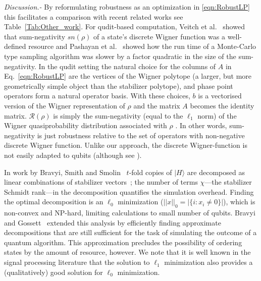 \documentclass[aps,prl,twocolumn,showpacs,superscriptaddress,groupedaddress,amsmath,amssymb]{revtex4-1}  %
\def\ket #1{\vert #1\rangle}
\begin{document}
\noindent\textit{Discussion.-} By reformulating robustness as an optimization in \eqref{eqn:RobustLP} this facilitates a comparison with recent related works see Table~\ref{Tab:Other_work}. For qudit-based computation, Veitch et al.~\cite{veitch_resource_2014} showed that sum-negativity $sn(\rho)$ of a state's discrete Wigner function was a well-defined resource and Pashayan et al.~\cite{pashayan_estimating_2015} showed how the run time of a Monte-Carlo type sampling algorithm was slower by a factor quadratic in the size of the sum-negativity. In the qudit setting the natural choice for the columns of $A$ in Eq.~\eqref{eqn:RobustLP} are the vertices of the Wigner polytope (a larger, but more geometrically simple object than the stabilizer polytope), and phase point operators form a natural operator basis. With these choices, $b$ is a vectorised version of the Wigner representation of $\rho$ and the matrix $A$ becomes the identity matrix. $\mathcal{R}(\rho)$ is simply the sum-negativity (equal to the $\ell_1$ norm) of the Wigner quasiprobability distribution associated with $\rho$ . In other words, sum-negativity is just robustness relative to the set of operators with non-negative discrete Wigner function.  Unlike our approach, the discrete Wigner-function is not easily adapted to qubits (although see \cite{delfosse_wigner_2015,raussendorf_contextuality_2015}).

In work by Bravyi, Smith and Smolin~\cite{bravyi_trading_2016} $t$-fold copies of $\ket{H}$ are decomposed as linear combinations of stabilizer vectors~\cite{garcia_geometry_2014}; the number of terms $\chi$---the stabilizer Schmidt rank---in the decomposition quantifies the simulation overhead. Finding the optimal decomposition is an $\ell_0$ minimization ($||x||_0=|\{i: x_i \neq 0\}|$), which is non-convex and NP-hard, limiting calculations to small number of qubits. Bravyi and Gossett~\cite{bravyi_improved_2016} extended this analysis by efficiently finding approximate decompositions that are still sufficient for the task of simulating the outcome of a quantum algorithm. This approximation precludes the possibility of ordering states by the amount of resource, however.  We note that it is well known in the signal processing literature \cite{candes_decoding_2005} that the solution to $\ell_1$ minimization also provides a (qualitatively) good solution for $\ell_0$ minimization.
\end{document}
